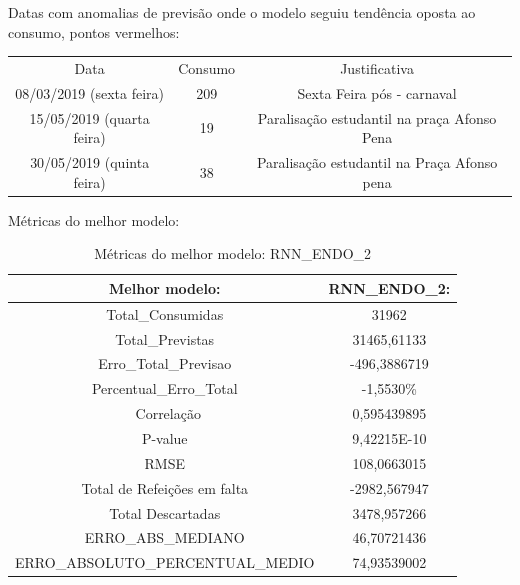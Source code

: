             Datas com anomalias de previsão onde o modelo seguiu tendência oposta ao consumo, pontos vermelhos:
            \begin{table}[!ht]
                 \begin{tabular}{|c|c|c|}
                 \rowcolor{gray!50}
                 \hline
            Data & Consumo & Justificativa \\
            08/03/2019 (sexta feira)   & 209 &Sexta Feira pós - carnaval\\
           15/05/2019 (quarta feira)   & 19  & Paralisação estudantil na praça Afonso Pena\\
            30/05/2019 (quinta feira)   &  38  & Paralisação estudantil na Praça Afonso pena\\
            \hline \end{tabular} \end{table}

            Métricas do melhor modelo: 
            \begin{table}[!ht]
            \centering
            \begin{tabular}{|c|c|}
            \rowcolor{gray!50}
            \hline
                Melhor modelo: &   RNN\_ENDO\_2: \\ \hline
                Total\_Consumidas & 31962 \\ 
                Total\_Previstas & 31465,61133 \\
                Erro\_Total\_Previsao & -496,3886719 \\
                Percentual\_Erro\_Total & -1,5530\% \\\
                Correlação & 0,595439895 \\
                P-value & 9,42215E-10    \\
                RMSE &  108,0663015\\
                Total de Refeições em falta & -2982,567947 \\Total Descartadas & 3478,957266\\
                ERRO\_ABS\_MEDIANO & 46,70721436 
                \\ ERRO\_ABSOLUTO\_PERCENTUAL\_MEDIO & 74,93539002 \\ 
            \hline 
            \end{tabular}
            \caption{Métricas do melhor modelo:  RNN\_ENDO\_2 }
            \label{table:rnn_endo_2_test}
            \end{table}
            
